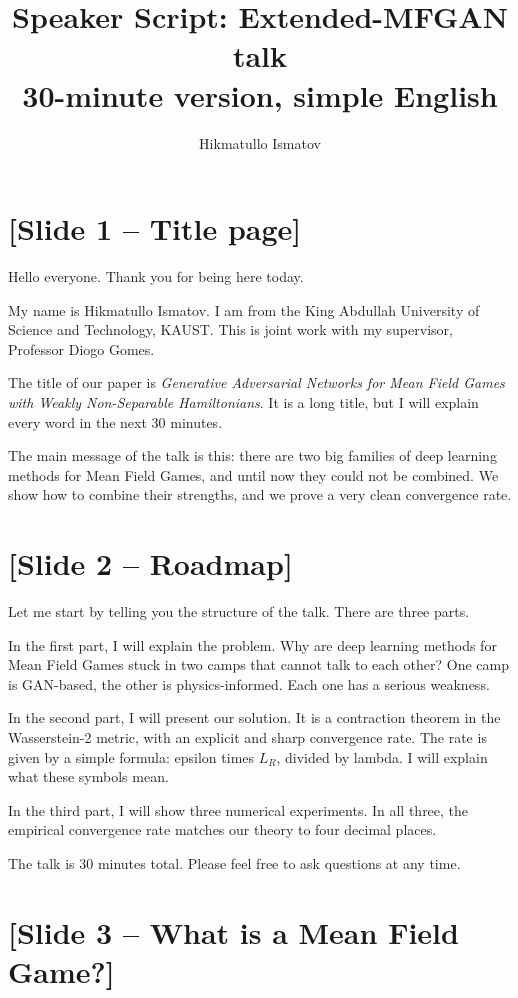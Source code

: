 \documentclass[11pt]{article}
\title{Speaker Script: Extended-MFGAN talk\\
       \large 30-minute version, simple English}
\author{Hikmatullo Ismatov}
\date{}
\begin{document}
\maketitle

\section*{[Slide 1 -- Title page]}

Hello everyone. Thank you for being here today.

My name is Hikmatullo Ismatov. I am from the King Abdullah University of Science
and Technology, KAUST. This is joint work with my supervisor, Professor Diogo
Gomes.

The title of our paper is \emph{Generative Adversarial Networks for Mean Field
Games with Weakly Non-Separable Hamiltonians}. It is a long title, but I will
explain every word in the next 30 minutes.

The main message of the talk is this: there are two big families of deep
learning methods for Mean Field Games, and until now they could not be
combined. We show how to combine their strengths, and we prove a very clean
convergence rate.

\section*{[Slide 2 -- Roadmap]}

Let me start by telling you the structure of the talk. There are three parts.

In the first part, I will explain the problem. Why are deep learning methods
for Mean Field Games stuck in two camps that cannot talk to each other? One
camp is GAN-based, the other is physics-informed. Each one has a serious
weakness.

In the second part, I will present our solution. It is a contraction theorem
in the Wasserstein-2 metric, with an explicit and sharp convergence rate.
The rate is given by a simple formula: epsilon times $L_R$, divided by lambda.
I will explain what these symbols mean.

In the third part, I will show three numerical experiments. In all three,
the empirical convergence rate matches our theory to four decimal places.

The talk is 30 minutes total. Please feel free to ask questions at any time.

\section*{[Slide 3 -- What is a Mean Field Game?]}
\end{document}
